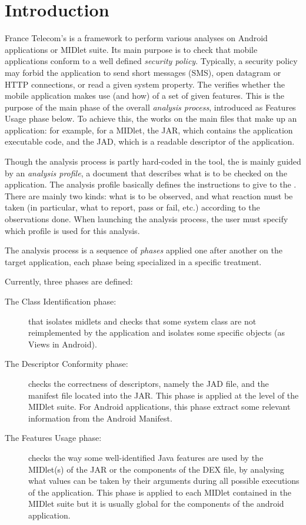 \chapter*{Introduction}


France Telecom's \ma is a framework to perform various analyses
on Android applications or MIDlet suite. 
Its main purpose is to check that mobile applications conform to a well
defined \emph{security policy}. Typically, a security policy may forbid the application to send short messages (SMS), open datagram or HTTP connections, or read a given system property. The \ma verifies whether the mobile application makes use (and how) of a  set of given
features. This is the purpose of the main phase of the overall
\emph{analysis process}, introduced as Features Usage phase below.
To achieve this, the \ma works on the main files that make up an
application: for example, for a MIDlet, the JAR, which contains the application
executable code, and the JAD, which is a readable descriptor of the application.

Though the analysis process is partly hard-coded in the tool, the \ma
is mainly guided by an \emph{analysis profile}, a document that
describes what is to be checked on the application. The analysis profile basically
defines the instructions to give to the \ma. 
There are mainly two kinds: what is to be observed, and
what reaction must be taken (in particular, what to report, pass or
fail, etc.) according to the observations done. 
When launching the analysis process, the user must specify which profile is
used for this analysis.

The analysis process is a sequence of \emph{phases} applied one after
another on the target application, each phase being specialized in a
specific treatment.

Currently, three phases are defined:
\begin{description}
  \item[The Class Identification phase:] that isolates midlets and checks that
  some system class are not reimplemented by the application and isolates some
  specific objects (as Views in Android).
  \item[The Descriptor Conformity phase:] checks the correctness of descriptors, namely 
  the JAD file, and the manifest file located into the JAR. This phase is
  applied at the level of the MIDlet suite. For Android applications, this phase
  extract some relevant information from the Android Manifest.
  \item[The Features Usage phase:] checks the way some
  well-identified Java features are used by the MIDlet(s) of the JAR or the
  components of the DEX file, by analysing what values can be taken by their
  arguments during all possible executions of the application. 
  This phase is applied to each MIDlet contained in the MIDlet suite but it is
  usually global for the components of the android application.
\end{description}

